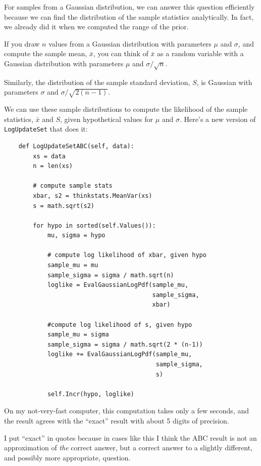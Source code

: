 \documentclass[12pt]{book}
\begin{document}
For samples from a Gaussian distribution, we can answer this question
efficiently because we can find the distribution of the sample
statistics analytically.  In fact, we already did it when we computed
the range of the prior.

If you draw $n$ values from a Gaussian distribution with parameters
$\mu$ and $\sigma$, and compute the sample mean, $\bar{x}$, you can
think of $\bar{x}$ as a random variable with a Gaussian distribution
with parameters $\mu$ and $\sigma / \sqrt{n}$.

Similarly, the distribution of the sample standard deviation, $S$, is
Gaussian with parameters $\sigma$ and $\sigma / \sqrt{2 (n-1)}$.

We can use these sample distributions to compute the likelihood of the
sample statistics, $\bar{x}$ and $S$, given hypothetical values
for $\mu$ and $\sigma$.  Here's a new version of \verb"LogUpdateSet"
that does it:

\begin{verbatim}
    def LogUpdateSetABC(self, data):
        xs = data
        n = len(xs)

        # compute sample stats
        xbar, s2 = thinkstats.MeanVar(xs)
        s = math.sqrt(s2)

        for hypo in sorted(self.Values()):
            mu, sigma = hypo

            # compute log likelihood of xbar, given hypo
            sample_mu = mu
            sample_sigma = sigma / math.sqrt(n)
            loglike = EvalGaussianLogPdf(sample_mu, 
                                         sample_sigma,
                                         xbar)

            #compute log likelihood of s, given hypo
            sample_mu = sigma
            sample_sigma = sigma / math.sqrt(2 * (n-1))
            loglike += EvalGaussianLogPdf(sample_mu, 
                                          sample_sigma,
                                          s)

            self.Incr(hypo, loglike)
\end{verbatim}

On my not-very-fast computer, this computation takes only a few seconds,
and the result agrees with the ``exact'' result with about 5 digits of
precision.

I put ``exact'' in quotes because in cases like this I think the ABC
result is not an approximation of {\em the} correct answer, but a
correct answer to a slightly different, and possibly more appropriate,
question.
\end{document}
